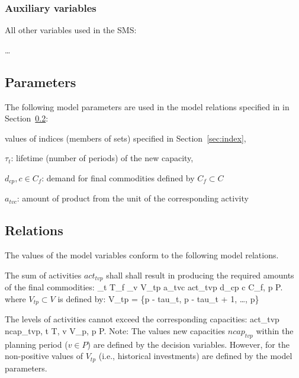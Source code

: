 \documentclass[a4paper,12pt]{article}
\begin{document}
\subsubsection{Auxiliary variables}
All other variables used in the SMS:
\btlb
\item \dots
\etl

\subsection{Parameters}
The following model parameters are used in the model relations 
specified in in Section~\ref{sec:rel}:
\btlb
\item values of indices (members of sets) specified in Section~\ref{sec:index},
\item $\tau_t$: lifetime (number of periods) of the new capacity,
\item $d_{cp}, c \in C_f$: demand for final commodities defined by $C_f \subset C$
\item $a_{tvc}$: amount of product from the unit of the corresponding activity
\etl

\subsection{Relations}\label{sec:rel}
The values of the model variables conform to the following model relations.
\btlb
\item The sum of activities $act_{tvp}$ shall shall result in producing the required
	amounts of the final commodities:
	\be
	\sum_{t \in T_f} \sum_{v \in V_{tp}} a_{tvc} \cdot act_{tvp} \ge d_{cp} \quad
		c \in C_f, p \in P.
	\ee
	where $V_{tp} \subset V$ is defined by:
	\be
		V_{tp} = \{p - tau_t, p - tau_t + 1, \dots, p\}
	\ee
\item The levels of activities cannot exceed the corresponding capacities:
	\be
		act_{tvp} \le ncap_{tvp}, \quad t \in T, v \in V_p, p \in P.
	\ee
	Note: The values new capacities $ncap_{tvp}$ within the planning period
	($v \in P$) are defined by the decision variables.
	However, for the non-positive values of $V_{tp}$ (i.e., historical investments)
	are defined by the model parameters.
\etl




\newpage
\end{document}
